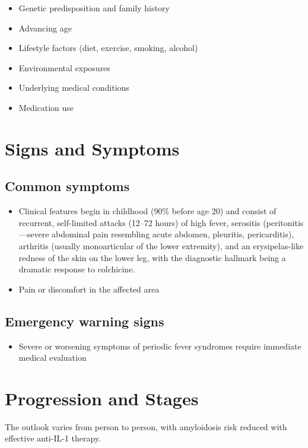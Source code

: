 \begin{itemize}[noitemsep]
  \item Genetic predisposition and family history
  \item Advancing age
  \item Lifestyle factors (diet, exercise, smoking, alcohol)
  \item Environmental exposures
  \item Underlying medical conditions
  \item Medication use
\end{itemize}
\section{Signs and Symptoms}

\subsection{Common symptoms}
\begin{itemize}[noitemsep]
  \item Clinical features begin in childhood (90\% before age 20) and consist of recurrent, self-limited attacks (12--72 hours) of high fever, serositis (peritonitis---severe abdominal pain resembling acute abdomen, pleuritis, pericarditis), arthritis (usually monoarticular of the lower extremity), and an erysipelas-like redness of the skin on the lower leg, with the diagnostic hallmark being a dramatic response to colchicine.

  \item Pain or discomfort in the affected area
  \end{itemize}

\subsection{Emergency warning signs}
\begin{itemize}[noitemsep]
  \item Severe or worsening symptoms of periodic fever syndromes require immediate medical evaluation
\end{itemize}
\section{Progression and Stages}
The outlook varies from person to person, with amyloidosis risk reduced with effective anti-IL-1 therapy.

